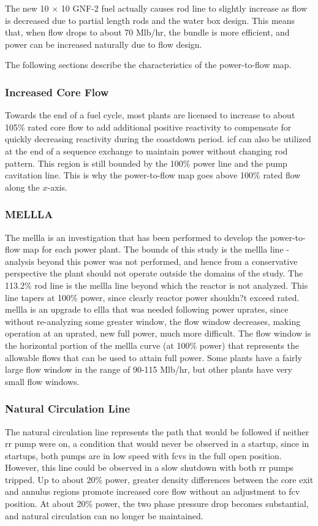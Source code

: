 \documentclass[10pt]{article}
\begin{document}
The new 10 \(\times\) 10 GNF-2 fuel actually causes rod line to slightly increase as flow is decreased due to partial length rods and the water box design. This means that, when flow drops to about 70 Mlb/hr, the bundle is more efficient, and power can be increased naturally due to flow design. 

The following sections describe the characteristics of the power-to-flow map.

\subsubsection{Increased Core Flow}
Towards the end of a fuel cycle, most plants are licensed to increase to about 105\% rated core flow to add additional positive reactivity to compensate for quickly decreasing reactivity during the coastdown period. \gls{icf} can also be utilized at the end of a sequence exchange to maintain power without changing rod pattern. This region is still bounded by the 100\% power line and the pump cavitation line. This is why the power-to-flow map goes above 100\% rated flow along the \(x\)-axis.

\subsubsection{MELLLA}
The \gls{mellla} is an investigation that has been performed to develop the power-to-flow map for each power plant. The bounds of this study is the \gls{mellla} line - analysis beyond this power was not performed, and hence from a conservative perspective the plant should not operate outside the domains of the study. The 113.2\% rod line is the \gls{mellla} line beyond which the reactor is not analyzed. This line tapers at 100\% power, since clearly reactor power shouldn?t exceed rated. \gls{mellla} is an upgrade to \gls{ellla} that was needed following power uprates, since without re-analyzing some greater window, the flow window decreases, making operation at an uprated, new full power, much more difficult. The flow window is the horizontal portion of the \gls{mellla} curve (at 100\% power) that represents the allowable flows that can be used to attain full power. Some plants have a fairly large flow window in the range of 90-115 Mlb/hr, but other plants have very small flow windows. 

\subsubsection{Natural Circulation Line}
The natural circulation line represents the path that would be followed if neither \gls{rr} pump were on, a condition that would never be observed in a startup, since in startups, both pumps are in low speed with \gls{fcv}s in the full open position. However, this line could be observed in a slow shutdown with both \gls{rr} pumps tripped. Up to about 20\% power, greater density differences between the core exit and annulus regions promote increased core flow without an adjustment to \gls{fcv} position. At about 20\% power, the two phase pressure drop becomes substantial, and natural circulation can no longer be maintained. 
\end{document}
